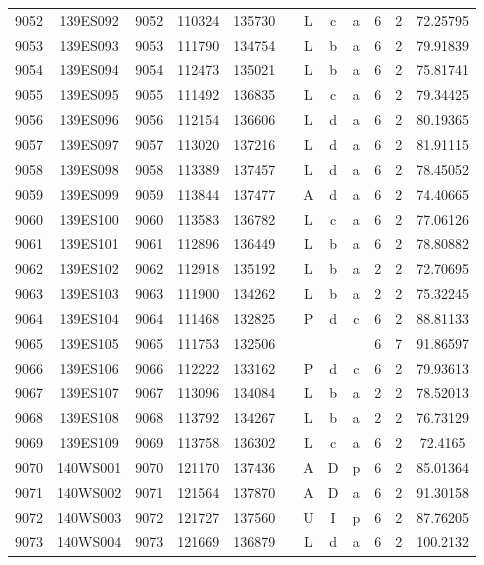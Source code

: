 \begin{tabular}{|*{12}{c|}}
9052 & 139ES092 & 9052 & 110324 & 135730 &  & L & c & a & 6 & 2 & 72.25795 \\ 
9053 & 139ES093 & 9053 & 111790 & 134754 &  & L & b & a & 6 & 2 & 79.91839 \\ 
9054 & 139ES094 & 9054 & 112473 & 135021 &  & L & b & a & 6 & 2 & 75.81741 \\ 
9055 & 139ES095 & 9055 & 111492 & 136835 &  & L & c & a & 6 & 2 & 79.34425 \\ 
9056 & 139ES096 & 9056 & 112154 & 136606 &  & L & d & a & 6 & 2 & 80.19365 \\ 
9057 & 139ES097 & 9057 & 113020 & 137216 &  & L & d & a & 6 & 2 & 81.91115 \\ 
9058 & 139ES098 & 9058 & 113389 & 137457 &  & L & d & a & 6 & 2 & 78.45052 \\ 
9059 & 139ES099 & 9059 & 113844 & 137477 &  & A & d & a & 6 & 2 & 74.40665 \\ 
9060 & 139ES100 & 9060 & 113583 & 136782 &  & L & c & a & 6 & 2 & 77.06126 \\ 
9061 & 139ES101 & 9061 & 112896 & 136449 &  & L & b & a & 6 & 2 & 78.80882 \\ 
9062 & 139ES102 & 9062 & 112918 & 135192 &  & L & b & a & 2 & 2 & 72.70695 \\ 
9063 & 139ES103 & 9063 & 111900 & 134262 &  & L & b & a & 2 & 2 & 75.32245 \\ 
9064 & 139ES104 & 9064 & 111468 & 132825 &  & P & d & c & 6 & 2 & 88.81133 \\ 
9065 & 139ES105 & 9065 & 111753 & 132506 &  &  &  &  & 6 & 7 & 91.86597 \\ 
9066 & 139ES106 & 9066 & 112222 & 133162 &  & P & d & c & 6 & 2 & 79.93613 \\ 
9067 & 139ES107 & 9067 & 113096 & 134084 &  & L & b & a & 2 & 2 & 78.52013 \\ 
9068 & 139ES108 & 9068 & 113792 & 134267 &  & L & b & a & 2 & 2 & 76.73129 \\ 
9069 & 139ES109 & 9069 & 113758 & 136302 &  & L & c & a & 6 & 2 & 72.4165 \\ 
9070 & 140WS001 & 9070 & 121170 & 137436 &  & A & D & p & 6 & 2 & 85.01364 \\ 
9071 & 140WS002 & 9071 & 121564 & 137870 &  & A & D & a & 6 & 2 & 91.30158 \\ 
9072 & 140WS003 & 9072 & 121727 & 137560 &  & U & I & p & 6 & 2 & 87.76205 \\ 
9073 & 140WS004 & 9073 & 121669 & 136879 &  & L & d & a & 6 & 2 & 100.2132 \\ 

\end{tabular}
